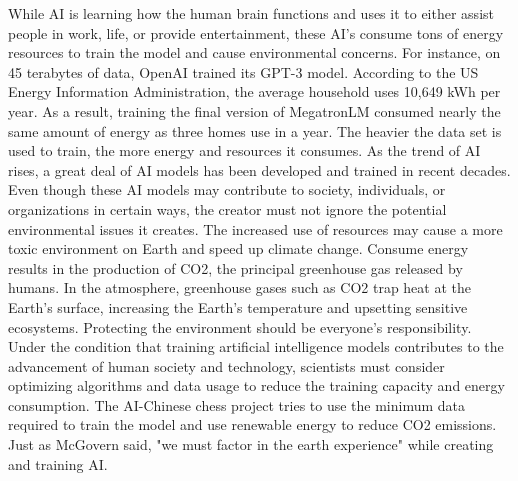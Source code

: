 \documentclass[10pt,twocolumn]{article}
\begin{document}
	While AI is learning how the human brain functions and uses it to either assist people in work, life, or provide entertainment, these AI's consume tons of energy resources to train the model and cause environmental concerns. For instance, on 45 terabytes of data, OpenAI trained its GPT-3 model. According to the US Energy Information Administration, the average household uses 10,649 kWh per year. As a result, training the final version of MegatronLM consumed nearly the same amount of energy as three homes use in a year\cite{EnergyConsumption}. The heavier the data set is used to train, the more energy and resources it consumes. As the trend of AI rises, a great deal of AI models has been developed and trained in recent decades. Even though these AI models may contribute to society, individuals, or organizations in certain ways, the creator must not ignore the potential environmental issues it creates. The increased use of resources may cause a more toxic environment on Earth and speed up climate change. Consume energy results in the production of CO2, the principal greenhouse gas released by humans. In the atmosphere, greenhouse gases such as CO2 trap heat at the Earth's surface, increasing the Earth's temperature and upsetting sensitive ecosystems. Protecting the environment should be everyone's responsibility. Under the condition that training artificial intelligence models contributes to the advancement of human society and technology, scientists must consider optimizing algorithms and data usage to reduce the training capacity and energy consumption. The AI-Chinese chess project tries to use the minimum data required to train the model and use renewable energy to reduce CO2 emissions. Just as McGovern said, "we must factor in the earth experience" while creating and training AI.  
\end{document}
